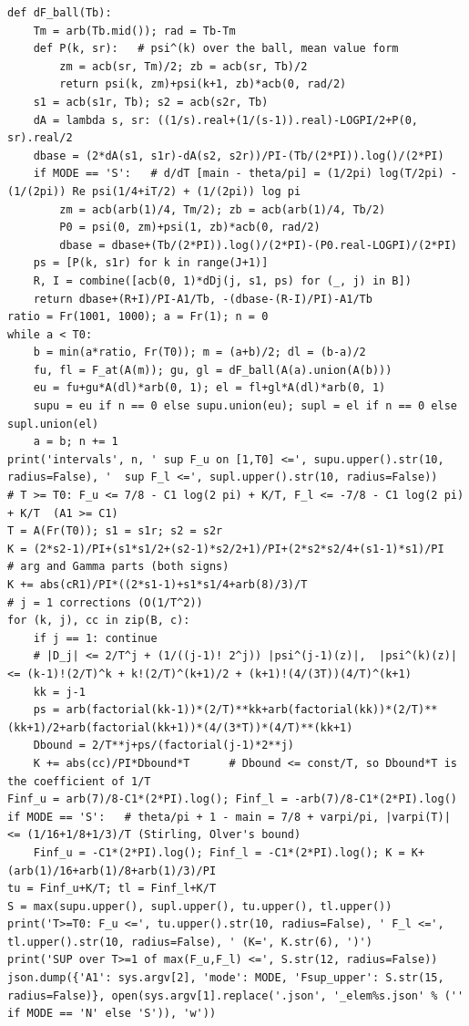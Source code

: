 \documentclass[11pt,reqno]{amsart}
\numberwithin{equation}{section}
\theoremstyle{definition}
\theoremstyle{remark}
\begin{document}
\begin{lstlisting}
def dF_ball(Tb):
    Tm = arb(Tb.mid()); rad = Tb-Tm
    def P(k, sr):   # psi^(k) over the ball, mean value form
        zm = acb(sr, Tm)/2; zb = acb(sr, Tb)/2
        return psi(k, zm)+psi(k+1, zb)*acb(0, rad/2)
    s1 = acb(s1r, Tb); s2 = acb(s2r, Tb)
    dA = lambda s, sr: ((1/s).real+(1/(s-1)).real)-LOGPI/2+P(0, sr).real/2
    dbase = (2*dA(s1, s1r)-dA(s2, s2r))/PI-(Tb/(2*PI)).log()/(2*PI)
    if MODE == 'S':   # d/dT [main - theta/pi] = (1/2pi) log(T/2pi) - (1/(2pi)) Re psi(1/4+iT/2) + (1/(2pi)) log pi
        zm = acb(arb(1)/4, Tm/2); zb = acb(arb(1)/4, Tb/2)
        P0 = psi(0, zm)+psi(1, zb)*acb(0, rad/2)
        dbase = dbase+(Tb/(2*PI)).log()/(2*PI)-(P0.real-LOGPI)/(2*PI)
    ps = [P(k, s1r) for k in range(J+1)]
    R, I = combine([acb(0, 1)*dDj(j, s1, ps) for (_, j) in B])
    return dbase+(R+I)/PI-A1/Tb, -(dbase-(R-I)/PI)-A1/Tb
ratio = Fr(1001, 1000); a = Fr(1); n = 0
while a < T0:
    b = min(a*ratio, Fr(T0)); m = (a+b)/2; dl = (b-a)/2
    fu, fl = F_at(A(m)); gu, gl = dF_ball(A(a).union(A(b)))
    eu = fu+gu*A(dl)*arb(0, 1); el = fl+gl*A(dl)*arb(0, 1)
    supu = eu if n == 0 else supu.union(eu); supl = el if n == 0 else supl.union(el)
    a = b; n += 1
print('intervals', n, ' sup F_u on [1,T0] <=', supu.upper().str(10, radius=False), '  sup F_l <=', supl.upper().str(10, radius=False))
# T >= T0: F_u <= 7/8 - C1 log(2 pi) + K/T, F_l <= -7/8 - C1 log(2 pi) + K/T  (A1 >= C1)
T = A(Fr(T0)); s1 = s1r; s2 = s2r
K = (2*s2-1)/PI+(s1*s1/2+(s2-1)*s2/2+1)/PI+(2*s2*s2/4+(s1-1)*s1)/PI      # arg and Gamma parts (both signs)
K += abs(cR1)/PI*((2*s1-1)+s1*s1/4+arb(8)/3)/T                           # j = 1 corrections (O(1/T^2))
for (k, j), cc in zip(B, c):
    if j == 1: continue
    # |D_j| <= 2/T^j + (1/((j-1)! 2^j)) |psi^(j-1)(z)|,  |psi^(k)(z)| <= (k-1)!(2/T)^k + k!(2/T)^(k+1)/2 + (k+1)!(4/(3T))(4/T)^(k+1)
    kk = j-1
    ps = arb(factorial(kk-1))*(2/T)**kk+arb(factorial(kk))*(2/T)**(kk+1)/2+arb(factorial(kk+1))*(4/(3*T))*(4/T)**(kk+1)
    Dbound = 2/T**j+ps/(factorial(j-1)*2**j)
    K += abs(cc)/PI*Dbound*T      # Dbound <= const/T, so Dbound*T is the coefficient of 1/T
Finf_u = arb(7)/8-C1*(2*PI).log(); Finf_l = -arb(7)/8-C1*(2*PI).log()
if MODE == 'S':   # theta/pi + 1 - main = 7/8 + varpi/pi, |varpi(T)| <= (1/16+1/8+1/3)/T (Stirling, Olver's bound)
    Finf_u = -C1*(2*PI).log(); Finf_l = -C1*(2*PI).log(); K = K+(arb(1)/16+arb(1)/8+arb(1)/3)/PI
tu = Finf_u+K/T; tl = Finf_l+K/T
S = max(supu.upper(), supl.upper(), tu.upper(), tl.upper())
print('T>=T0: F_u <=', tu.upper().str(10, radius=False), ' F_l <=', tl.upper().str(10, radius=False), ' (K=', K.str(6), ')')
print('SUP over T>=1 of max(F_u,F_l) <=', S.str(12, radius=False))
json.dump({'A1': sys.argv[2], 'mode': MODE, 'Fsup_upper': S.str(15, radius=False)}, open(sys.argv[1].replace('.json', '_elem%s.json' % ('' if MODE == 'N' else 'S')), 'w'))
\end{lstlisting}
\end{document}
